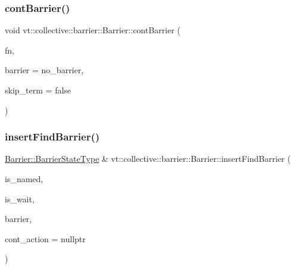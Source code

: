 \mbox{\label{structvt_1_1collective_1_1barrier_1_1_barrier_aecec014f5db3d5b608ca553a91acc732}} 
\subsubsection{\texorpdfstring{cont\+Barrier()}{contBarrier()}}
{\footnotesize\ttfamily void vt\+::collective\+::barrier\+::\+Barrier\+::cont\+Barrier (\begin{DoxyParamCaption}\item[{\hyperlink{namespacevt_ae0a5a7b18cc99d7b732cb4d44f46b0f3}{Action\+Type}}]{fn,  }\item[{\hyperlink{namespacevt_a25e481f0d6bbc7204db23d1c87a62e77}{Barrier\+Type} const \&}]{barrier = {\ttfamily no\+\_\+barrier},  }\item[{bool const}]{skip\+\_\+term = {\ttfamily false} }\end{DoxyParamCaption})\hspace{0.3cm}{\ttfamily [private]}}

\mbox{\label{structvt_1_1collective_1_1barrier_1_1_barrier_aa3f74f986e523701c1d85ed97d3ad5a4}} 
\subsubsection{\texorpdfstring{insert\+Find\+Barrier()}{insertFindBarrier()}}
{\footnotesize\ttfamily \hyperlink{structvt_1_1collective_1_1barrier_1_1_barrier_a9b612818f7b44ca65f2caee0dee094f3}{Barrier\+::\+Barrier\+State\+Type} \& vt\+::collective\+::barrier\+::\+Barrier\+::insert\+Find\+Barrier (\begin{DoxyParamCaption}\item[{bool const \&}]{is\+\_\+named,  }\item[{bool const \&}]{is\+\_\+wait,  }\item[{\hyperlink{namespacevt_a25e481f0d6bbc7204db23d1c87a62e77}{Barrier\+Type} const \&}]{barrier,  }\item[{\hyperlink{namespacevt_ae0a5a7b18cc99d7b732cb4d44f46b0f3}{Action\+Type}}]{cont\+\_\+action = {\ttfamily nullptr} }\end{DoxyParamCaption})}

